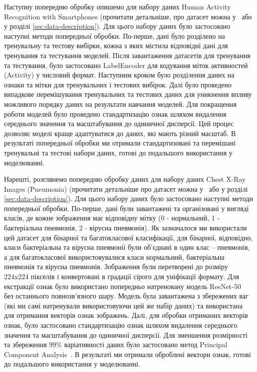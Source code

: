 Наступну попередню обробку опишемо для набору даних Human Activity Recognition with Smartphones (прочитати детальніше, про датасет можна у~\cite{ct31} або у розділі \ref{sec:data-description}). Для цього набору даних було застосовано наступні методи попередньої обробки. По-перше, дані було розділено на тренувальну та тестову вибірки, кожна з яких містила відповідні дані для тренування та тестування моделей. Після завантаження датасетів для тренування та тестування, було застосовано LabelEncoder для кодування міток активностей (Activity) у числовий формат. Наступним кроком було розділення даних на ознаки та мітки для тренувальних і тестових вибірок. Далі було проведено випадкове перемішування тренувальних та тестових даних для уникнення впливу можливого порядку даних на результати навчання моделей. Для покращення роботи моделей було проведено стандартизацію ознак шляхом видалення середнього значення та масштабування до одиничної дисперсії. Цей процес дозволяє моделі краще адаптуватися до даних, які мають різний масштаб. В результаті попередньої обробки ми отримали стандартизовані та перемішані тренувальні та тестові набори даних, готові до подальшого використання у моделюванні. 

Нарешті, розглянемо попередню обробку даних для набору даних Chest X-Ray Images (Pneumonia) (прочитати детальніше про датасет можна у~\cite{ct32} або у розділі \ref{sec:data-description}). Для цього набору даних було застосовано наступні методи попередньої обробки. По-перше, дані були завантажені та організовані у вигляді класів, де кожне зображення має відповідну мітку (0 - нормальний, 1 - бактеріальна пневмонія, 2 - вірусна пневмонія). Як зазначалося ми використали цей датасет для бінарної та багатокласової класифікації, для бінарної, відповідно, класи бактеріальна та вірусна пневмонії були об'єднані в один клас -- пневмонія, а для багатокласової використовувалися класи нормальний, бактеріальна пневмонія та вірусна пневмонія. Зображення були перетворені до розміру 224x224 пікселів і конвертовані в градації сірого для уніфікації формату. Для екстракції ознак було використано попередньо натреновану модель ResNet-50~\cite{ct35} без останнього повнозв'язного шару. Модель була завантажена з збережених ваг (які ми самі натренували використовуючи цей же набір даних) та використана для отримання векторів ознак зображень. Далі, для обробки отриманих векторів ознак, було застосовано стандартизацію ознак шляхом видалення середнього значення та масштабування до одиничної дисперсії. Для зменшення розмірності та збереження 99$\%$ варіативності даних було застосовано метод Principal Component Analysis~\cite{ct36}. В результаті ми отримали оброблені вектори ознак, готові до подальшого використання у моделюванні.

